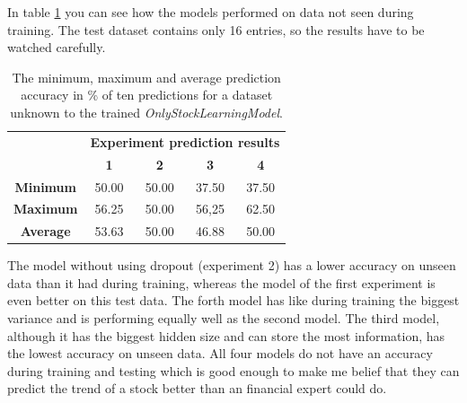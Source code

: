 In table \ref{tbl:oslmpredictresults} you can see how the models performed on data not seen during training. The test dataset contains only 16 entries, so the results have to be watched carefully.
\begin{table}[!ht]
	\begin{center}
		\begin{tabular}{c|c|c|c|c|}
			\multirow{2}{1cm}{} & \multicolumn{4}{c|}{\textbf{Experiment prediction results}} \\
			& \textbf{1} & \textbf{2} & \textbf{3} & \textbf{4}\\
			\hline
			\textbf{Minimum} & 50.00 & 50.00 & 37.50 & 37.50 \\
			\hline
			\textbf{Maximum} & 56.25 & 50.00 & 56,25 & 62.50 \\
			\hline
			\textbf{Average} & 53.63 & 50.00 & 46.88 & 50.00 \\
		\end{tabular}
	\end{center}
	\caption{The minimum, maximum and average prediction accuracy in \% of ten predictions for a dataset unknown to the trained \textit{OnlyStockLearningModel}. }
	\label{tbl:oslmpredictresults}
\end{table}
The model without using dropout (experiment 2) has a lower accuracy on unseen data than it had during training, whereas the model of the first experiment is even better on this test data. The forth model has like during training the biggest variance and is performing equally well as the second model. The third model, although it has the biggest hidden size and can store the most information, has the lowest accuracy on unseen data. All four models do not have an accuracy during training and testing which is good enough to make me belief that they can predict the trend of a stock better than an financial expert could do.


